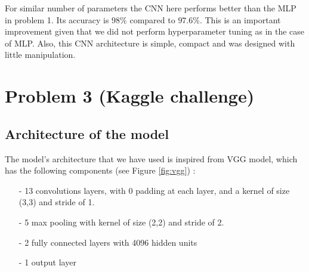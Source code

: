 \documentclass[a4paper]{article}
\begin{document}
For similar number of parameters the CNN here performs better than the MLP in problem 1. Its accuracy is $98\%$ compared to $97.6\%$. This is an important improvement given that we did not perform hyperparameter tuning as in the case of MLP. Also, this CNN architecture is simple, compact and was designed with little manipulation.  

\newpage
\section{Problem 3 (Kaggle challenge)}
\label{sec:problem3}

\subsection{Architecture of the model}
The model's architecture that we have used is inspired from VGG model, which has the following components (see Figure \ref{fig:vgg}) :
%
\begin{itemize}
\setlength\itemsep{0em}
	\item[-] 13 convolutions layers, with 0 padding at each layer, and a kernel of size (3,3) and stride of 1.
	\item[-] 5 max pooling with kernel of size (2,2) and stride of 2.
	\item[-] 2 fully connected layers with 4096 hidden units
	\item[-] 1 output layer
\end{itemize}
%
\end{document}
